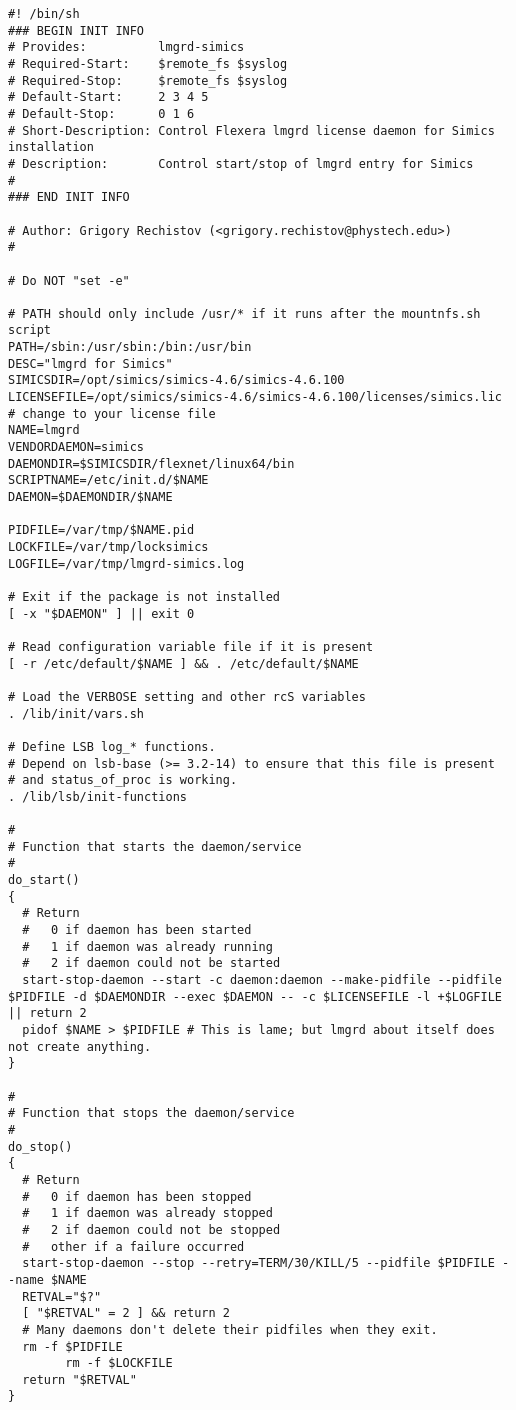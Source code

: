 \begin{lstlisting}
#! /bin/sh
### BEGIN INIT INFO
# Provides:          lmgrd-simics
# Required-Start:    $remote_fs $syslog
# Required-Stop:     $remote_fs $syslog
# Default-Start:     2 3 4 5
# Default-Stop:      0 1 6
# Short-Description: Control Flexera lmgrd license daemon for Simics installation
# Description:       Control start/stop of lmgrd entry for Simics
#
### END INIT INFO

# Author: Grigory Rechistov (<grigory.rechistov@phystech.edu>)
#

# Do NOT "set -e"

# PATH should only include /usr/* if it runs after the mountnfs.sh script
PATH=/sbin:/usr/sbin:/bin:/usr/bin
DESC="lmgrd for Simics"
SIMICSDIR=/opt/simics/simics-4.6/simics-4.6.100
LICENSEFILE=/opt/simics/simics-4.6/simics-4.6.100/licenses/simics.lic # change to your license file
NAME=lmgrd
VENDORDAEMON=simics
DAEMONDIR=$SIMICSDIR/flexnet/linux64/bin
SCRIPTNAME=/etc/init.d/$NAME
DAEMON=$DAEMONDIR/$NAME

PIDFILE=/var/tmp/$NAME.pid
LOCKFILE=/var/tmp/locksimics
LOGFILE=/var/tmp/lmgrd-simics.log

# Exit if the package is not installed
[ -x "$DAEMON" ] || exit 0

# Read configuration variable file if it is present
[ -r /etc/default/$NAME ] && . /etc/default/$NAME

# Load the VERBOSE setting and other rcS variables
. /lib/init/vars.sh

# Define LSB log_* functions.
# Depend on lsb-base (>= 3.2-14) to ensure that this file is present
# and status_of_proc is working.
. /lib/lsb/init-functions

#
# Function that starts the daemon/service
#
do_start()
{
  # Return
  #   0 if daemon has been started
  #   1 if daemon was already running
  #   2 if daemon could not be started
  start-stop-daemon --start -c daemon:daemon --make-pidfile --pidfile $PIDFILE -d $DAEMONDIR --exec $DAEMON -- -c $LICENSEFILE -l +$LOGFILE || return 2
  pidof $NAME > $PIDFILE # This is lame; but lmgrd about itself does not create anything.
}

#
# Function that stops the daemon/service
#
do_stop()
{
  # Return
  #   0 if daemon has been stopped
  #   1 if daemon was already stopped
  #   2 if daemon could not be stopped
  #   other if a failure occurred
  start-stop-daemon --stop --retry=TERM/30/KILL/5 --pidfile $PIDFILE --name $NAME
  RETVAL="$?"
  [ "$RETVAL" = 2 ] && return 2
  # Many daemons don't delete their pidfiles when they exit.
  rm -f $PIDFILE
        rm -f $LOCKFILE
  return "$RETVAL"
}


\end{lstlisting}

